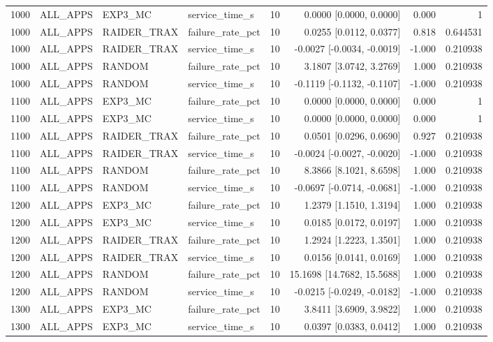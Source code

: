 \begin{tabular}{rlllrrrr}
1000 & ALL\_APPS & EXP3\_MC & service\_time\_s & 10 & 0.0000 [0.0000, 0.0000] & 0.000 & 1 \\
1000 & ALL\_APPS & RAIDER\_TRAX & failure\_rate\_pct & 10 & 0.0255 [0.0112, 0.0377] & 0.818 & 0.644531 \\
1000 & ALL\_APPS & RAIDER\_TRAX & service\_time\_s & 10 & -0.0027 [-0.0034, -0.0019] & -1.000 & 0.210938 \\
1000 & ALL\_APPS & RANDOM & failure\_rate\_pct & 10 & 3.1807 [3.0742, 3.2769] & 1.000 & 0.210938 \\
1000 & ALL\_APPS & RANDOM & service\_time\_s & 10 & -0.1119 [-0.1132, -0.1107] & -1.000 & 0.210938 \\
1100 & ALL\_APPS & EXP3\_MC & failure\_rate\_pct & 10 & 0.0000 [0.0000, 0.0000] & 0.000 & 1 \\
1100 & ALL\_APPS & EXP3\_MC & service\_time\_s & 10 & 0.0000 [0.0000, 0.0000] & 0.000 & 1 \\
1100 & ALL\_APPS & RAIDER\_TRAX & failure\_rate\_pct & 10 & 0.0501 [0.0296, 0.0690] & 0.927 & 0.210938 \\
1100 & ALL\_APPS & RAIDER\_TRAX & service\_time\_s & 10 & -0.0024 [-0.0027, -0.0020] & -1.000 & 0.210938 \\
1100 & ALL\_APPS & RANDOM & failure\_rate\_pct & 10 & 8.3866 [8.1021, 8.6598] & 1.000 & 0.210938 \\
1100 & ALL\_APPS & RANDOM & service\_time\_s & 10 & -0.0697 [-0.0714, -0.0681] & -1.000 & 0.210938 \\
1200 & ALL\_APPS & EXP3\_MC & failure\_rate\_pct & 10 & 1.2379 [1.1510, 1.3194] & 1.000 & 0.210938 \\
1200 & ALL\_APPS & EXP3\_MC & service\_time\_s & 10 & 0.0185 [0.0172, 0.0197] & 1.000 & 0.210938 \\
1200 & ALL\_APPS & RAIDER\_TRAX & failure\_rate\_pct & 10 & 1.2924 [1.2223, 1.3501] & 1.000 & 0.210938 \\
1200 & ALL\_APPS & RAIDER\_TRAX & service\_time\_s & 10 & 0.0156 [0.0141, 0.0169] & 1.000 & 0.210938 \\
1200 & ALL\_APPS & RANDOM & failure\_rate\_pct & 10 & 15.1698 [14.7682, 15.5688] & 1.000 & 0.210938 \\
1200 & ALL\_APPS & RANDOM & service\_time\_s & 10 & -0.0215 [-0.0249, -0.0182] & -1.000 & 0.210938 \\
1300 & ALL\_APPS & EXP3\_MC & failure\_rate\_pct & 10 & 3.8411 [3.6909, 3.9822] & 1.000 & 0.210938 \\
1300 & ALL\_APPS & EXP3\_MC & service\_time\_s & 10 & 0.0397 [0.0383, 0.0412] & 1.000 & 0.210938 \\

\end{tabular}
